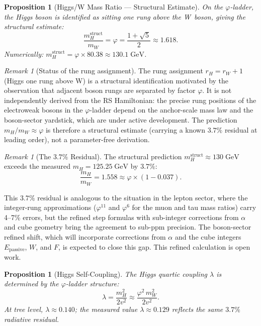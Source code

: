 \documentclass[12pt,a4paper]{article}
\newtheorem{proposition}[theorem]{Proposition}
\theoremstyle{definition}
\theoremstyle{remark}
\newtheorem{remark}[theorem]{Remark}
\begin{document}
\begin{proposition}[Higgs/W Mass Ratio --- Structural Estimate]
\label{thm:ratio}
On the $\varphi$-ladder, the Higgs boson is identified as sitting
one rung above the W~boson, giving the structural estimate:
\begin{equation}
  \boxed{\frac{m_H^{\mathrm{struct}}}{m_W} = \varphi
  = \frac{1 + \sqrt{5}}{2} \approx 1.618.}
\end{equation}
Numerically: $m_H^{\mathrm{struct}} = \varphi \times 80.38
\approx 130.1\;\mathrm{GeV}$.
\end{proposition}

\begin{remark}[Status of the rung assignment]
The rung assignment $r_H = r_W + 1$ (Higgs one rung above W)
is a structural identification motivated by the observation that
adjacent boson rungs are separated by factor $\varphi$.  It is not
independently derived from the RS Hamiltonian: the precise rung
positions of the electroweak bosons in the $\varphi$-ladder depend
on the anchor-scale mass law and the boson-sector yardstick, which
are under active development.  The prediction $m_H / m_W \approx
\varphi$ is therefore a structural estimate (carrying a known
$3.7\%$ residual at leading order), not a parameter-free derivation.
\end{remark}

\begin{remark}[The $3.7\%$ Residual]
\label{rem:residual}
The structural prediction $m_H^{\mathrm{struct}} \approx
130\;\mathrm{GeV}$ exceeds the measured
$m_H = 125.25\;\mathrm{GeV}$ by $3.7\%$:
\begin{equation}
  \frac{m_H}{m_W} = 1.558 \approx \varphi \times (1 - 0.037).
\end{equation}

This $3.7\%$ residual is analogous to the situation in the
lepton sector, where the integer-rung approximations
($\varphi^{11}$ and $\varphi^{6}$ for the muon and tau
mass ratios) carry 4--7\% errors, but the refined step
formulas with sub-integer corrections from $\alpha$ and cube
geometry bring the agreement to sub-ppm precision.
The boson-sector refined shift, which will incorporate
corrections from $\alpha$ and the cube integers
$E_{\mathrm{passive}}$, $W$, and $F$, is expected to close
this gap.  This refined calculation is open work.
\end{remark}

\begin{proposition}[Higgs Self-Coupling]
\label{prop:coupling}
The Higgs quartic coupling $\lambda$ is determined by the
$\varphi$-ladder structure:
\begin{equation}
  \lambda = \frac{m_H^2}{2v^2}
  \approx \frac{\varphi^2 \, m_W^2}{2v^2}.
\end{equation}
At tree level, $\lambda \approx 0.140$; the measured
value $\lambda \approx 0.129$ reflects the same $3.7\%$
radiative residual.
\end{proposition}
\end{document}
